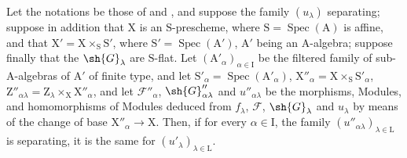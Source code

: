 \begin{lemma}[11.9.12]
\label{IV.11.9.12}
Let the notations be those of  and , and suppose the family $(u_\lambda)$ separating; suppose in addition that $\mathrm{X}$ is an $\mathrm{S}$-prescheme, where $\mathrm{S}=\operatorname{Spec}(\mathrm{A})$ is affine, and that $\mathrm{X}'=\mathrm{X}\times_\mathrm{S}\mathrm{S}'$, where $\mathrm{S}'=\operatorname{Spec}(\mathrm{A}')$, $\mathrm{A}'$ being an $\mathrm{A}$-algebra; suppose finally that the $\sh{G}_\lambda$ are $\mathrm{S}$-flat.
Let $(\mathrm{A}'_\alpha)_{\alpha\in\mathrm{I}}$ be the filtered family of sub-$\mathrm{A}$-algebras of $\mathrm{A}'$ of finite type, and let $\mathrm{S}'_\alpha=\operatorname{Spec}(\mathrm{A}'_\alpha)$, $\mathrm{X}''_\alpha=\mathrm{X}\times_\mathrm{S}\mathrm{S}'_\alpha$, $\mathrm{Z}''_{\alpha\lambda}=\mathrm{Z}_\lambda\times_\mathrm{X}\mathrm{X}''_\alpha$, and let $\mathscr{F}''_\alpha$, $\sh{G}''_{\alpha\lambda}$ and $u''_{\alpha\lambda}$ be the morphisms, Modules, and homomorphisms of Modules deduced from $f_\lambda$, $\mathscr{F}$, $\sh{G}_\lambda$ and $u_\lambda$ by means of the change of base $\mathrm{X}''_\alpha\to\mathrm{X}$.
Then, if for every $\alpha\in\mathrm{I}$, the family $(u''_{\alpha\lambda})_{\lambda\in\mathrm{L}}$ is separating, it is the same for $(u'_\lambda)_{\lambda\in\mathrm{L}}$.
\end{lemma}

